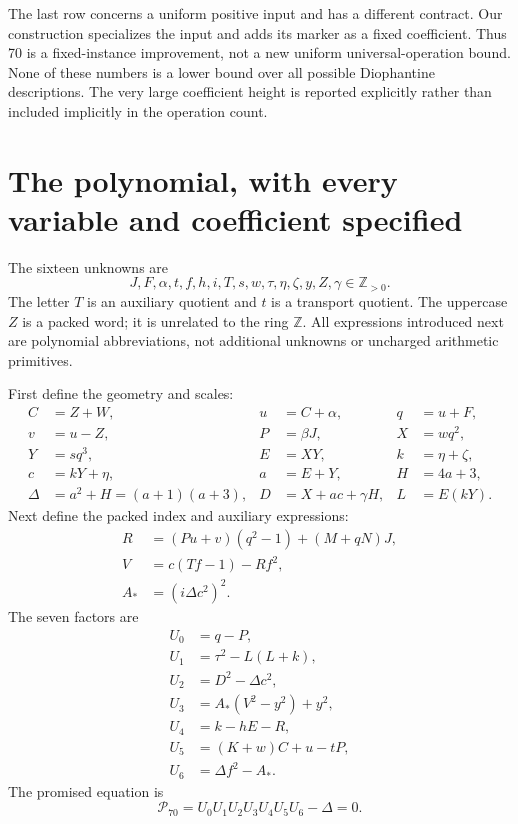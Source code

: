 \documentclass[11pt]{article}
\theoremstyle{definition}
\newcommand{\Z}{\mathbb Z}
\newcommand{\Pos}{\mathbb Z_{>0}}
\newcommand{\norms}{\mathcal P}
\begin{document}
The last row concerns a uniform positive input and has a different contract.
Our construction specializes the input and adds its marker as a fixed
coefficient. Thus 70 is a fixed-instance improvement, not a new uniform
universal-operation bound. None of these numbers is a lower bound over all
possible Diophantine descriptions. The very large coefficient height is
reported explicitly rather than included implicitly in the operation count.

\section{The polynomial, with every variable and coefficient specified}
\label{sec:polynomial}

The sixteen unknowns are
\[
 \boxed{J,F,\alpha,t,f,h,i,T,s,w,\tau,\eta,\zeta,y,Z,\gamma\in\Pos.}
\]
The letter $T$ is an auxiliary quotient and $t$ is a transport quotient.
The uppercase $Z$ is a packed word; it is unrelated to the ring $\Z$.
All expressions introduced next are polynomial abbreviations, not additional
unknowns or uncharged arithmetic primitives.

First define the geometry and scales:
\begin{align}
 C&=Z+W,& u&=C+\alpha,& q&=u+F,\label{eq:geometry}\\
 v&=u-Z,& P&=\beta J,& X&=wq^2,\nonumber\\
 Y&=sq^3,& E&=XY,& k&=\eta+\zeta,\label{eq:scales}\\
 c&=kY+\eta,& a&=E+Y,& H&=4a+3,\nonumber\\
 \Delta&=a^2+H=(a+1)(a+3),&
 D&=X+ac+\gamma H,& L&=E(kY).\label{eq:pell-data}
\end{align}
Next define the packed index and auxiliary expressions:
\begin{align}
 R&=(Pu+v)(q^2-1)+(M+qN)J,\label{eq:packed70}\\
 V&=c(Tf-1)-Rf^2,\label{eq:bezout}\\
 A_*&=(i\Delta c^2)^2.\label{eq:aux-coeff}
\end{align}
The seven factors are
\begin{align}
 U_0&=q-P,\label{eq:factors}\\
 U_1&=\tau^2-L(L+k),\nonumber\\
 U_2&=D^2-\Delta c^2,\nonumber\\
 U_3&=A_*(V^2-y^2)+y^2,\nonumber\\
 U_4&=k-hE-R,\nonumber\\
 U_5&=(K+w)C+u-tP,\nonumber\\
 U_6&=\Delta f^2-A_* .\nonumber
\end{align}
The promised equation is
\begin{equation}\label{eq:main-polynomial}
 \boxed{\qquad
 \norms_{70}=U_0U_1U_2U_3U_4U_5U_6-\Delta=0.
 \qquad}
\end{equation}
\end{document}
